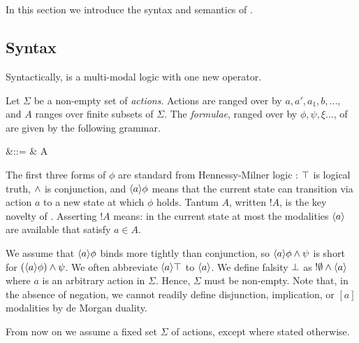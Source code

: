 \section{\Cathoristic{}}\label{coreEL}

In this section we introduce the syntax and semantics of \cathoristic{}.

\subsection{Syntax}
\label{elsyntax}
\NI Syntactically, \cathoristic{} is a multi-modal logic with one new
operator.

\begin{definition} Let $\Sigma$ be a non-empty set of \emph{actions}.
Actions are ranged over by $a, a', a_1, b, ...$, and $A$ ranges over
finite subsets of $\Sigma$. The \emph{formulae}, ranged over by $\phi,
\psi, \xi ...$, of \cathoristic{} are given by the
following grammar.

\begin{GRAMMAR}
  \phi 
     &\quad ::= \quad & 
  \TRUE 
     \VERTICAL 
  \phi \AND \psi
     \VERTICAL 
     \VERTICAL 
  \fBang A 
\end{GRAMMAR}
\end{definition}

\NI The first three forms of $\phi$ are standard from Hennessy-Milner logic : $\top$ is logical truth, $\land$ is  conjunction, 
and $\langle a \rangle \phi$ means that the current state
can transition via action $a$ to a new state at which
$\phi$ holds. Tantum $A$, 
written $!A$, is the key novelty of \cathoristic{}.  Asserting $!A$
means: in the current state at most the modalities $\langle a \rangle$ are
available that satisfy $a \in A$.  

We assume that $\langle a \rangle \phi$ binds more tightly than conjunction, so
$\langle a \rangle \phi \land \psi$ is short for $(\langle a \rangle \phi) \land \psi$.
We often abbreviate $\langle a \rangle \top$ to $\langle a \rangle$. We define falsity
$\bot$ as $!\emptyset \land \langle a \rangle$ where $a$ is an arbitrary
action in $\Sigma$. 
Hence, $\Sigma$ must be
non-empty. 
Note that, in the absence of negation, we cannot
readily define disjunction, implication, or $[a]$ modalities by de
Morgan duality. 

\begin{convention}
From now on we assume a fixed set $\Sigma$ of actions, except where
stated otherwise.
\end{convention}

